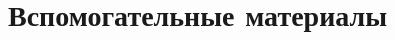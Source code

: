 \documentclass[aspectratio=169, 13pt]{beamer}
\begin{document}

\appendix

\section*{Вспомогательные материалы}
\end{document}
